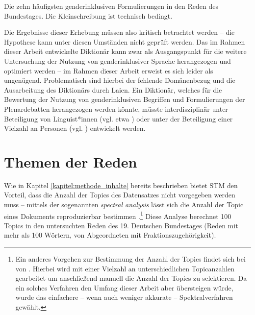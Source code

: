 \documentclass[12pt, 
    twoside=false, 
    bibliography=totoc, 
    numbers=endperiod, 
    headings=normal, 
    toc=chapterentrydotfill
    ]{scrbook}
\begin{document}
\begin{table}[htb]
    \centering
    \caption[Die zehn häufigsten genderinklusiven Formulierungen in den Reden des Bundestages]{Die zehn häufigsten genderinklusiven Formulierungen in den Reden des Bundestages. Die Kleinschreibung ist technisch bedingt.}
    
    \label{table:top_gender_phrasen}
\end{table}


Die Ergebnisse dieser Erhebung müssen also kritisch betrachtet werden -- die Hypothese kann unter diesen Umständen nicht geprüft werden. Das im Rahmen dieser Arbeit entwickelte Diktionär kann zwar als Ausgangspunkt für die weitere Untersuchung der Nutzung von genderinklusiver Sprache herangezogen und optimiert werden -- im Rahmen dieser Arbeit erweist es sich leider als ungenügend. Problematisch sind hierbei der fehlende Domänenbezug und die Ausarbeitung des Diktionärs durch Laien. Ein Diktionär, welches für die Bewertung der Nutzung von genderinklusiven Begriffen und Formulierungen der Plenardebatten herangezogen werden könnte, müsste interdisziplinär unter Beteiligung von Linguist*innen (vgl. etwa \parencite{remus_sentiws_2010}) oder unter der Beteiligung einer Vielzahl an Personen (vgl. \parencite{haselmayer_2017}) entwickelt werden.


\section{Themen der Reden}\label{kapitel:auswertung_themen}

Wie in Kapitel \ref{kapitel:methode_inhalte} bereits beschrieben bietet STM den Vorteil, dass die Anzahl der Topics des Datensatzes nicht vorgegeben werden muss -- mittels der sogenannten \emph{spectral analysis} lässt sich die Anzahl der Topic eines Dokuments reproduzierbar bestimmen \parencites[11]{roberts_2018}[30ff.]{roberts_2016}.\footnote{Ein anderes Vorgehen zur Bestimmung der Anzahl der Topics findet sich bei  von \textcite[6ff.]{roberts_2014}. Hierbei wird mit einer Vielzahl an unterschiedlichen Topicanzahlen gearbeitet um anschließend manuell die Anzahl der Topics zu selektieren. Da ein solches Verfahren den Umfang dieser Arbeit aber übersteigen würde, wurde das einfachere -- wenn auch weniger akkurate -- Spektralverfahren gewählt.} Diese Analyse berechnet 100 Topics in den untersuchten Reden des 19. Deutschen Bundestages (Reden mit mehr als 100 Wörtern, von Abgeordneten mit Fraktionszugehörigkeit).
\end{document}
